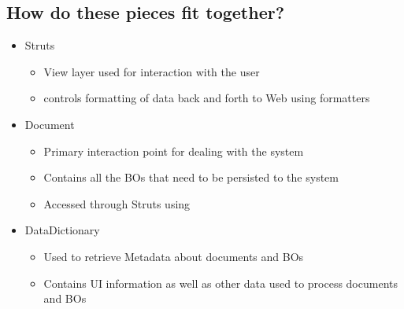 \begin{ifhtml}
\begin{s5slide}
        \section{How do these pieces fit together?}
        \begin{ifhtml}
            \begin{itemize}
                \item Struts
                \begin{itemize}
                    \item View layer used for interaction with the user
                    \item controls formatting of data back and forth to Web using formatters 
                \end{itemize}
                \item Document
                \begin{itemize}
                    \item Primary interaction point for dealing with the system
                    \item Contains all the BOs that need to be persisted to the system
                    \item Accessed through Struts using 
                \end{itemize}
                \item DataDictionary
                \begin{itemize}
                    \item Used to retrieve Metadata about documents and BOs
                    \item Contains UI information as well as other data used to process documents and BOs
                \end{itemize}
            \end{itemize}
        \end{ifhtml} 
    \end{s5slide}
    \begin{s5slide}

\end{s5slide}
\end{ifhtml}
